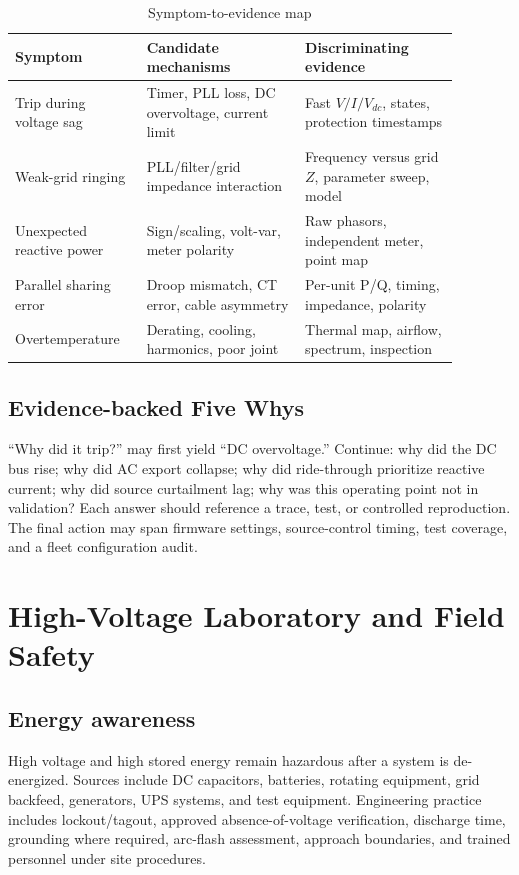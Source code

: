 \documentclass[11pt]{article}
\begin{document}
\begin{table}[h]
\centering
\caption{Symptom-to-evidence map}
\begin{tabular}{p{0.25\linewidth}p{0.32\linewidth}p{0.31\linewidth}}
\toprule
Symptom & Candidate mechanisms & Discriminating evidence \\
\midrule
Trip during voltage sag & Timer, PLL loss, DC overvoltage, current limit & Fast $V/I/V_{dc}$, states, protection timestamps \\
Weak-grid ringing & PLL/filter/grid impedance interaction & Frequency versus grid $Z$, parameter sweep, model \\
Unexpected reactive power & Sign/scaling, volt-var, meter polarity & Raw phasors, independent meter, point map \\
Parallel sharing error & Droop mismatch, CT error, cable asymmetry & Per-unit P/Q, timing, impedance, polarity \\
Overtemperature & Derating, cooling, harmonics, poor joint & Thermal map, airflow, spectrum, inspection \\
\bottomrule
\end{tabular}
\end{table}

\subsection{Evidence-backed Five Whys}
``Why did it trip?'' may first yield ``DC overvoltage.'' Continue: why did the
DC bus rise; why did AC export collapse; why did ride-through prioritize
reactive current; why did source curtailment lag; why was this operating point
not in validation? Each answer should reference a trace, test, or controlled
reproduction. The final action may span firmware settings, source-control
timing, test coverage, and a fleet configuration audit.

\section{High-Voltage Laboratory and Field Safety}

\subsection{Energy awareness}
High voltage and high stored energy remain hazardous after a system is de-
energized. Sources include DC capacitors, batteries, rotating equipment, grid
backfeed, generators, UPS systems, and test equipment. Engineering practice
includes lockout/tagout, approved absence-of-voltage verification, discharge
time, grounding where required, arc-flash assessment, approach boundaries, and
trained personnel under site procedures.
\end{document}

